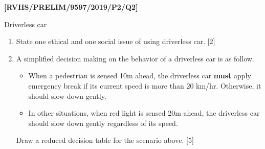 \item \textbf{{[}RVHS/PRELIM/9597/2019/P2/Q2{]} }

Driverless car
\begin{enumerate}
\item State one ethical and one social issue of using driverless car. \hfill{}{[}2{]}
\item A simplified decision making on the behavior of a driverless car is
as follow. 
\begin{itemize}
\item When a pedestrian is sensed 10m ahead, the driverless car \textbf{must}
apply emergency break if its current speed is more than 20 km/hr.
Otherwise, it should slow down gently.
\item In other situations, when red light is sensed 20m ahead, the driverless
car should slow down gently regardless of its speed. 
\end{itemize}
Draw a reduced decision table for the scenario above. \hfill{}{[}5{]}
\end{enumerate}